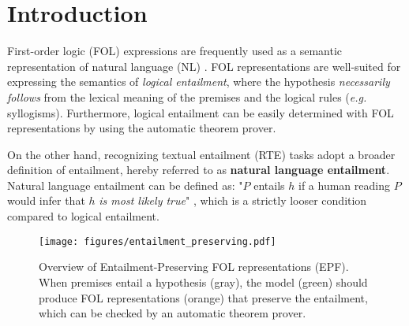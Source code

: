 \section{Introduction}


First-order logic (FOL) expressions are frequently used as a semantic representation of natural language (NL) \citep{bos-nli, folio, malls}. FOL representations are well-suited for expressing the semantics of \textit{logical entailment}, where the hypothesis \textit{necessarily follows} from the lexical meaning of the premises and the logical rules (\textit{e.g.} syllogisms). Furthermore, logical entailment can be easily determined with FOL representations by using the automatic theorem prover.

On the other hand, recognizing textual entailment (RTE) tasks \citep{rte, esnli, entailmentbank} adopt a broader definition of entailment, hereby referred to as \textbf{natural language entailment}. Natural language entailment can be defined as: "$P$ entails $h$ if a human reading $P$ would infer that $h$ \textit{is most likely true}" \citep{rte}, which is a strictly looser condition compared to logical entailment.

\begin{figure}[tp]
    \centering
    \texttt{[image: figures/entailment\_preserving.pdf]}
    \caption{Overview of Entailment-Preserving FOL representations (EPF). When premises entail a hypothesis (gray), the model (green) should produce FOL representations (orange) that preserve the entailment, which can be checked by an automatic theorem prover.}
    \label{fig:entailment-preserving}
\end{figure}

